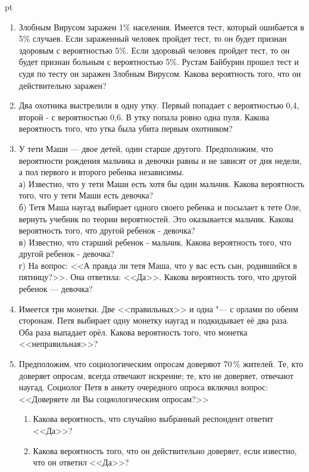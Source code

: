 \documentclass[pdftex,12pt,a4paper]{article}
\begin{document}
 pt %


\begin{enumerate}

\item Злобным Вирусом заражен 1\% населения. Имеется тест, который ошибается в 5\% случаев. Если зараженный человек пройдет тест, то он будет признан здоровым с вероятностью 5\%. Если здоровый человек пройдет тест, то он будет признан больным с вероятностью 5\%. Рустам Байбурин прошел тест и судя по тесту он заражен Злобным Вирусом. Какова вероятность того, что он действительно заражен?

\item Два охотника выстрелили в одну утку. Первый попадает с
вероятностью 0,4, второй - с вероятностью 0,6. В утку попала ровно
одна пуля. Какова вероятность того, что утка была убита первым
охотником?

\item У тети Маши --- двое детей, один старше другого. Предположим, что вероятности рождения мальчика и девочки равны и не зависят от дня недели, а пол первого и второго ребенка независимы. \\
а) Известно, что у тети Маши есть хотя бы один мальчик. Какова
вероятность того, что у тети Маши есть девочка? \\
б) Тетя Маша наугад выбирает одного своего
ребенка и посылает к тете Оле, вернуть учебник по теории
вероятностей. Это оказывается мальчик. Какова вероятность того,
что другой ребенок - девочка? \\
в) Известно, что старший ребенок - мальчик. Какова вероятность того, что другой ребенок - девочка? \\
г) На вопрос: <<А правда ли тетя Маша, что у вас есть сын, родившийся в пятницу?>>. Она ответила: <<Да>>. Какова вероятность того, что другой ребенок --- девочка?


\item Имеется три монетки. Две <<правильных>> и одна "--- с орлами по
обеим сторонам. Петя выбирает одну монетку наугад и подкидывает её
два раза. Оба раза выпадает орёл. Какова вероятность того, что
монетка <<неправильная>>?


\item Предположим, что социологическим опросам доверяют 70\,\% жителей. Те, кто доверяет опросам, всегда отвечают искренне; те, кто не доверяет, отвечают наугад. Социолог Петя  в анкету очередного опроса включил вопрос: <<Доверяете ли Вы социологическим опросам?>>
\begin{enumerate}
\item Какова вероятность, что случайно выбранный респондент ответит <<Да>>?
\item  Какова вероятность того, что он действительно доверяет, если известно, что он ответил <<Да>>?
\end{enumerate}


\end{enumerate}
\end{document}
